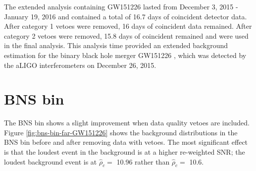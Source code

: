 The extended analysis containing GW151226 lasted from December 3, 2015 - January 19, 2016 and
contained a total of 16.7 days of coincident detector data.
After category 1 vetoes were removed, 16 days of coincident data remained. After
category 2 vetoes were removed, 15.8 days of coincident remained and were used in the
final analysis.
This analysis time provided
an extended background estimation for the binary black hole merger GW151226 \cite{GW151226},
which was detected by the aLIGO interferometers on December 26, 2015.

\section{BNS bin}

The BNS bin shows a slight improvement when data quality vetoes are included.
Figure \ref{fig:bns-bin-far-GW151226} shows the background distributions in the BNS
bin before and after removing data with vetoes. The most significant
effect is that the loudest event in the background is at a higher re-weighted SNR;
the loudest background event is at $\hat{\rho}_{c} =$ 10.96 rather
than $\hat{\rho}_{c} =$ 10.6.

